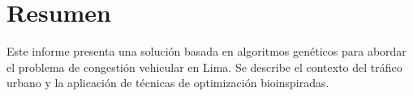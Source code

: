 \section*{Resumen}
Este informe presenta una solución basada en algoritmos genéticos para abordar el problema de congestión vehicular en Lima. Se describe el contexto del tráfico urbano y la aplicación de técnicas de optimización bioinspiradas.
